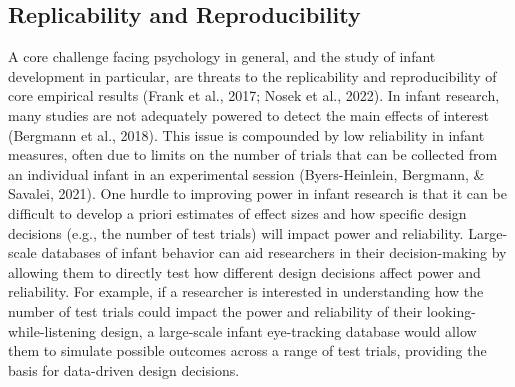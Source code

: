 \documentclass[
  english,
  man,floatsintext]{apa6}
\begin{document}
\hypertarget{replicability-and-reproducibility}{%
\subsection{Replicability and Reproducibility}\label{replicability-and-reproducibility}}

A core challenge facing psychology in general, and the study of infant development in particular, are threats to the replicability and reproducibility of core empirical results (Frank et al., 2017; Nosek et al., 2022).
In infant research, many studies are not adequately powered to detect the main effects of interest (Bergmann et al., 2018).
This issue is compounded by low reliability in infant measures, often due to limits on the number of trials that can be collected from an individual infant in an experimental session (Byers-Heinlein, Bergmann, \& Savalei, 2021).
One hurdle to improving power in infant research is that it can be difficult to develop a priori estimates of effect sizes and how specific design decisions (e.g., the number of test trials) will impact power and reliability.
Large-scale databases of infant behavior can aid researchers in their decision-making by allowing them to directly test how different design decisions affect power and reliability.
For example, if a researcher is interested in understanding how the number of test trials could impact the power and reliability of their looking-while-listening design, a large-scale infant eye-tracking database would allow them to simulate possible outcomes across a range of test trials, providing the basis for data-driven design decisions.
\end{document}
